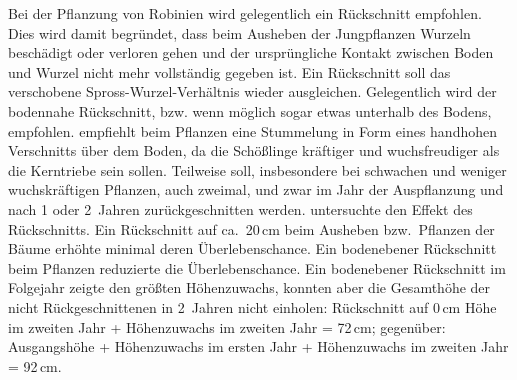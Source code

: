 \documentclass[twocolumn]{scrartcl}
\begin{document}
Bei der Pflanzung von Robinien wird gelegentlich ein Rückschnitt
empfohlen.
Dies wird damit begründet, dass beim Ausheben der Jungpflanzen Wurzeln beschädigt oder verloren gehen
und der ursprüngliche Kontakt zwischen Boden und Wurzel nicht mehr vollständig gegeben ist.
Ein Rückschnitt soll das verschobene Spross-Wurzel-Verhältnis wieder ausgleichen.
Gelegentlich wird der
bodennahe Rückschnitt, bzw. wenn möglich sogar etwas unterhalb des
Bodens, empfohlen.
\citet[S.~78]{erteld1952robinieErtrag} empfiehlt beim Pflanzen eine
Stummelung in Form eines handhohen Verschnitts über dem Boden, da die
Schößlinge kräftiger und wuchsfreudiger als die Kerntriebe sein
sollen. Teilweise soll, insbesondere bei schwachen und weniger
wuchskräftigen Pflanzen, auch zweimal, und zwar im Jahr der
Auspflanzung und nach 1 oder 2~Jahren zurückgeschnitten werden.
\citet{meginnis1940robinieRueckschnitt}
untersuchte den Effekt des Rückschnitts. Ein Rückschnitt auf
ca.\ 20\,cm beim Ausheben bzw.\ Pflanzen der Bäume erhöhte minimal
deren Überlebenschance. Ein bodenebener Rückschnitt beim Pflanzen
reduzierte die Überlebenschance. Ein bodenebener Rückschnitt im
Folgejahr zeigte den größten Höhenzuwachs, konnten aber die Gesamthöhe
der nicht Rückgeschnittenen in 2~Jahren nicht einholen:
Rückschnitt auf 0\,cm Höhe im zweiten Jahr + Höhenzuwachs im zweiten Jahr = 72\,cm;
gegenüber: Ausgangshöhe + Höhenzuwachs im ersten Jahr + Höhenzuwachs im zweiten Jahr = 92\,cm.
\end{document}
